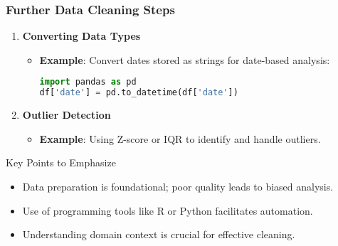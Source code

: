 \documentclass{beamer}
\begin{document}
\begin{frame}[fragile]
    \frametitle{Further Data Cleaning Steps}
    \begin{enumerate}[resume]
        \item \textbf{Converting Data Types}
            \begin{itemize}
                \item \textbf{Example}: Convert dates stored as strings for date-based analysis:
                \begin{lstlisting}[language=Python]
import pandas as pd
df['date'] = pd.to_datetime(df['date'])
                \end{lstlisting}
            \end{itemize}

        \item \textbf{Outlier Detection}
            \begin{itemize}
                \item \textbf{Example}: Using Z-score or IQR to identify and handle outliers.
            \end{itemize}
    \end{enumerate}
    
    \begin{block}{Key Points to Emphasize}
        \begin{itemize}
            \item Data preparation is foundational; poor quality leads to biased analysis.
            \item Use of programming tools like R or Python facilitates automation.
            \item Understanding domain context is crucial for effective cleaning.
        \end{itemize}
    \end{block}
\end{frame}
\end{document}
